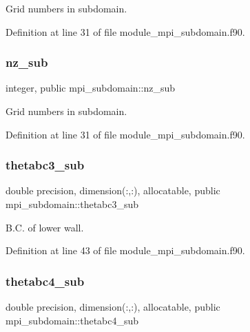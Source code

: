 Grid numbers in subdomain. 



Definition at line 31 of file module\+\_\+mpi\+\_\+subdomain.\+f90.

\mbox{\label{namespacempi__subdomain_a07555cc931ac78376a4c81207662251f}} 
\subsubsection{\texorpdfstring{nz\_sub}{nz\_sub}}
{\footnotesize\ttfamily integer, public mpi\+\_\+subdomain\+::nz\+\_\+sub}



Grid numbers in subdomain. 



Definition at line 31 of file module\+\_\+mpi\+\_\+subdomain.\+f90.

\mbox{\label{namespacempi__subdomain_ad61f27caf5f32301a077e21363c2d73b}} 
\subsubsection{\texorpdfstring{thetabc3\_sub}{thetabc3\_sub}}
{\footnotesize\ttfamily double precision, dimension(\+:,\+:), allocatable, public mpi\+\_\+subdomain\+::thetabc3\+\_\+sub}



B.\+C. of lower wall. 



Definition at line 43 of file module\+\_\+mpi\+\_\+subdomain.\+f90.

\mbox{\label{namespacempi__subdomain_ad1705bede0c0d39ad16f9f94afe32be6}} 
\subsubsection{\texorpdfstring{thetabc4\_sub}{thetabc4\_sub}}
{\footnotesize\ttfamily double precision, dimension(\+:,\+:), allocatable, public mpi\+\_\+subdomain\+::thetabc4\+\_\+sub}



